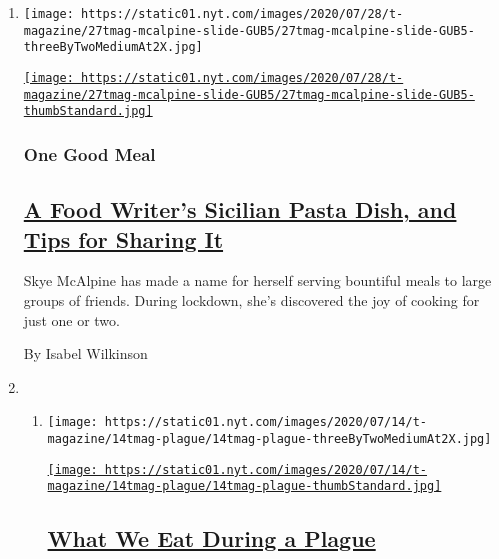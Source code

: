 \begin{enumerate}
\def\labelenumi{\arabic{enumi}.}
\item
  \texttt{[image: https://static01.nyt.com/images/2020/07/28/t-magazine/27tmag-mcalpine-slide-GUB5/27tmag-mcalpine-slide-GUB5-threeByTwoMediumAt2X.jpg]}

  \href{/2020/07/29/t-magazine/skye-mcalpine-pasta-cooking.html}{\texttt{[image: https://static01.nyt.com/images/2020/07/28/t-magazine/27tmag-mcalpine-slide-GUB5/27tmag-mcalpine-slide-GUB5-thumbStandard.jpg]}}

  \hypertarget{one-good-meal}{%
  \subsubsection{One Good Meal}\label{one-good-meal}}

  \hypertarget{a-food-writers-sicilian-pasta-dish-and-tips-for-sharing-it}{%
  \subsection{\texorpdfstring{\href{/2020/07/29/t-magazine/skye-mcalpine-pasta-cooking.html}{A
  Food Writer's Sicilian Pasta Dish, and Tips for Sharing
  It}}{A Food Writer's Sicilian Pasta Dish, and Tips for Sharing It}}\label{a-food-writers-sicilian-pasta-dish-and-tips-for-sharing-it}}

  Skye McAlpine has made a name for herself serving bountiful meals to
  large groups of friends. During lockdown, she's discovered the joy of
  cooking for just one or two.

  By Isabel Wilkinson
\item
  \begin{enumerate}
  \def\labelenumii{\arabic{enumii}.}
  \item
    \texttt{[image: https://static01.nyt.com/images/2020/07/14/t-magazine/14tmag-plague/14tmag-plague-threeByTwoMediumAt2X.jpg]}

    \href{/2020/07/16/t-magazine/eating-food-during-plague.html}{\texttt{[image: https://static01.nyt.com/images/2020/07/14/t-magazine/14tmag-plague/14tmag-plague-thumbStandard.jpg]}}

    \hypertarget{what-we-eat-during-a-plague}{%
    \subsection{\texorpdfstring{\href{/2020/07/16/t-magazine/eating-food-during-plague.html}{What
    We Eat During a
    Plague}}{What We Eat During a Plague}}\label{what-we-eat-during-a-plague}}


\end{enumerate}
\end{enumerate}
